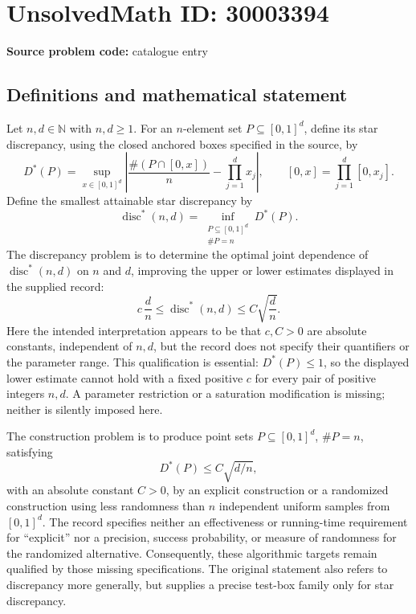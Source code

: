 \documentclass[11pt]{article}
\newcommand{\N}{\mathbb{N}}
\begin{document}
\section*{UnsolvedMath ID: 30003394}
\textbf{Source problem code:} catalogue entry
\subsection{Definitions and mathematical statement}
Let \(n,d\in\N\) with \(n,d\geq1\). For an \(n\)-element set \(P\subseteq[0,1]^d\), define its star discrepancy, using the closed anchored boxes specified in the source, by
\[
D^*(P)=\sup_{x\in[0,1]^d}\left|\frac{\#(P\cap[0,x])}{n}-\prod_{j=1}^d x_j\right|,
\qquad [0,x]=\prod_{j=1}^d[0,x_j].
\]
Define the smallest attainable star discrepancy by
\[
\operatorname{disc}^*(n,d)=\inf_{\substack{P\subseteq[0,1]^d\\\#P=n}}D^*(P).
\]
The discrepancy problem is to determine the optimal joint dependence of \(\operatorname{disc}^*(n,d)\) on \(n\) and \(d\), improving the upper or lower estimates displayed in the supplied record:
\[
c\,\frac dn\leq\operatorname{disc}^*(n,d)\leq C\sqrt{\frac dn}.
\]
Here the intended interpretation appears to be that \(c,C>0\) are absolute constants, independent of \(n,d\), but the record does not specify their quantifiers or the parameter range. This qualification is essential: \(D^*(P)\leq1\), so the displayed lower estimate cannot hold with a fixed positive \(c\) for every pair of positive integers \(n,d\). A parameter restriction or a saturation modification is missing; neither is silently imposed here.

The construction problem is to produce point sets \(P\subseteq[0,1]^d\), \(\#P=n\), satisfying
\[
D^*(P)\leq C\sqrt{d/n},
\]
with an absolute constant \(C>0\), by an explicit construction or a randomized construction using less randomness than \(n\) independent uniform samples from \([0,1]^d\). The record specifies neither an effectiveness or running-time requirement for ``explicit'' nor a precision, success probability, or measure of randomness for the randomized alternative. Consequently, these algorithmic targets remain qualified by those missing specifications. The original statement also refers to discrepancy more generally, but supplies a precise test-box family only for star discrepancy.
\end{document}
